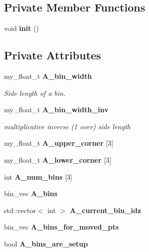 \subsection*{Private Member Functions}
\begin{CompactItemize}
\item 
void \textbf{init} ()\label{classASCbase_1_1geometry_1_1DistanceArray2_3a6b04a93a64eb5d858d75872809ed87}

\end{CompactItemize}
\subsection*{Private Attributes}
\begin{CompactItemize}
\item 
my\_\-float\_\-t \bf{A\_\-bin\_\-width}\label{classASCbase_1_1geometry_1_1DistanceArray2_46bf43dba80eca2a90354de43f3e090f}

\begin{CompactList}\small\item\em Side length of a bin. \item\end{CompactList}\item 
my\_\-float\_\-t \bf{A\_\-bin\_\-width\_\-inv}\label{classASCbase_1_1geometry_1_1DistanceArray2_d27b3690450da6a8df54915b042e4425}

\begin{CompactList}\small\item\em multiplicative inverse (1 over) side length \item\end{CompactList}\item 
my\_\-float\_\-t \textbf{A\_\-upper\_\-corner} [3]\label{classASCbase_1_1geometry_1_1DistanceArray2_c20120c88fe303758aa644279ceae45f}

\item 
my\_\-float\_\-t \textbf{A\_\-lower\_\-corner} [3]\label{classASCbase_1_1geometry_1_1DistanceArray2_7ec1a3b6cb3fc3c1fd73d8768fab7cfc}

\item 
int \textbf{A\_\-num\_\-bins} [3]\label{classASCbase_1_1geometry_1_1DistanceArray2_da392e2b7b553662d86c53d58e42cb2d}

\item 
bin\_\-vec \textbf{A\_\-bins}\label{classASCbase_1_1geometry_1_1DistanceArray2_358d86ba1f5aef66aa85e514e273ed0c}

\item 
std::vector$<$ int $>$ \textbf{A\_\-current\_\-bin\_\-idz}\label{classASCbase_1_1geometry_1_1DistanceArray2_ee6a02c194abdc0cd4f4c8caa1b7e238}

\item 
bin\_\-vec \textbf{A\_\-bins\_\-for\_\-moved\_\-pts}\label{classASCbase_1_1geometry_1_1DistanceArray2_df002d40101ccf23897a693eaac5084f}

\item 
bool \textbf{A\_\-bins\_\-are\_\-setup}\label{classASCbase_1_1geometry_1_1DistanceArray2_da8e60db90bd4144a04d5016294c2d1e}

\end{CompactItemize}


